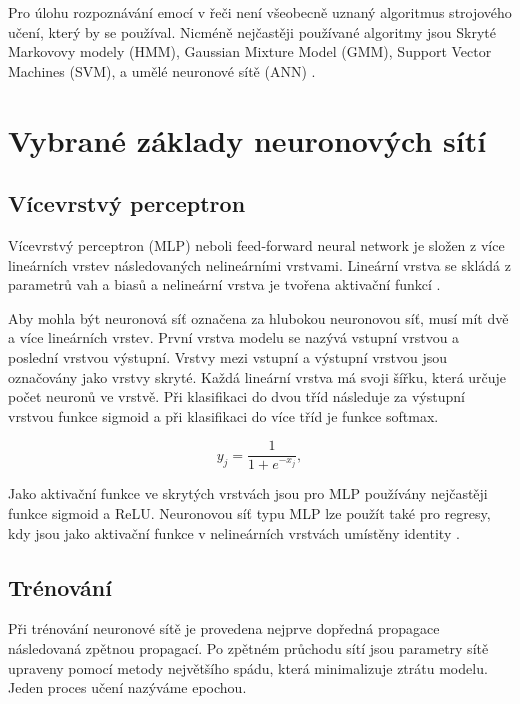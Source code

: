 \documentclass[FM,BP]{tulthesis}
\begin{document}
Pro úlohu rozpoznávání emocí v řeči není všeobecně uznaný algoritmus strojového učení, který by se používal. Nicméně nejčastěji používané algoritmy jsou Skryté Markovovy modely (HMM), Gaussian Mixture Model (GMM), Support Vector Machines (SVM), a umělé neuronové sítě (ANN) \cite{DBLP:journals/speech/AkcayO20}.

\chapter{Vybrané základy neuronových sítí}

\section{Vícevrstvý perceptron} %
Vícevrstvý perceptron (MLP) neboli feed-forward neural network je složen z více lineárních vrstev následovaných nelineárními vrstvami. Lineární vrstva se skládá z parametrů vah a biasů a nelineární vrstva je tvořena aktivační funkcí \cite{DBLP:books/lib/Bishop07}.

Aby mohla být neuronová síť označena za hlubokou neuronovou síť, musí mít dvě a více lineárních vrstev. První vrstva modelu se nazývá vstupní vrstvou a poslední vrstvou výstupní. Vrstvy mezi vstupní a výstupní vrstvou jsou označovány jako vrstvy skryté. Každá lineární vrstva má svoji šířku, která určuje počet neuronů ve vrstvě. Při klasifikaci do dvou tříd následuje za výstupní vrstvou funkce sigmoid a při klasifikaci do více tříd je funkce softmax.

\begin{equation}
\label{eqn:sigmoid}
y_j =  \frac{\mathrm{1} }{\mathrm{1} + e^{-x_j} },
\end{equation}

Jako aktivační funkce ve skrytých vrstvách jsou pro MLP používány nejčastěji funkce sigmoid a ReLU. Neuronovou síť typu MLP lze použít také pro regresy, kdy jsou jako aktivační funkce v nelineárních vrstvách umístěny identity \cite{DBLP:books/lib/Bishop07}.

\section{Trénování} %
Při trénování neuronové sítě je provedena nejprve dopředná propagace následovaná zpětnou propagací. Po zpětném průchodu sítí jsou parametry sítě upraveny pomocí metody největšího spádu, která minimalizuje ztrátu modelu. Jeden proces učení nazýváme epochou.
\end{document}
